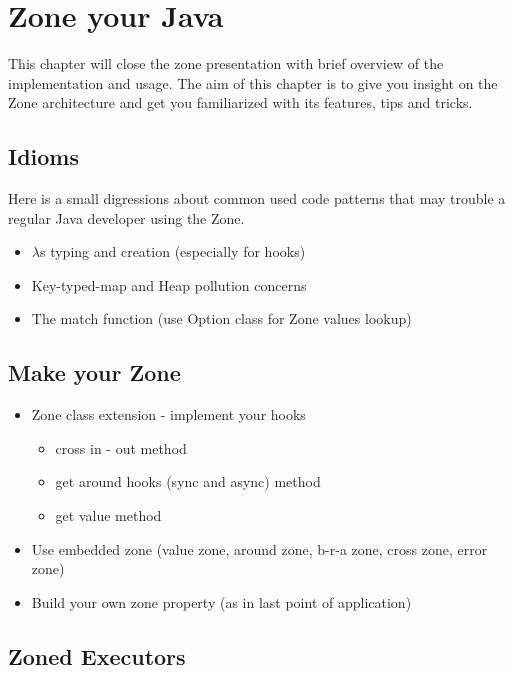
\chapter{Zone your Java}
\label{ch:impl}

This chapter will close the zone presentation with brief overview of the implementation and usage.
The aim of this chapter is to give you insight on the Zone architecture and get you familiarized with its features, tips and tricks.

\section{Idioms}

Here is a small digressions about common used code patterns that may trouble a regular Java developer using the Zone.

\begin{itemize}
\item $\lambda$s typing and creation (especially for hooks)
\item Key-typed-map and Heap pollution concerns
\item The match function (use Option class for Zone values lookup)
\end{itemize}

\section{Make your Zone}

\begin{itemize}
\item Zone class extension - implement your hooks
  \begin{itemize}
  \item cross in - out method
  \item get around hooks (sync and async) method
  \item get value method
  \end{itemize}
\item Use embedded zone (value zone, around zone, b-r-a zone, cross zone, error zone)
\item Build your own zone property (as in last point of application)
\end{itemize}


\section{Zoned Executors}

